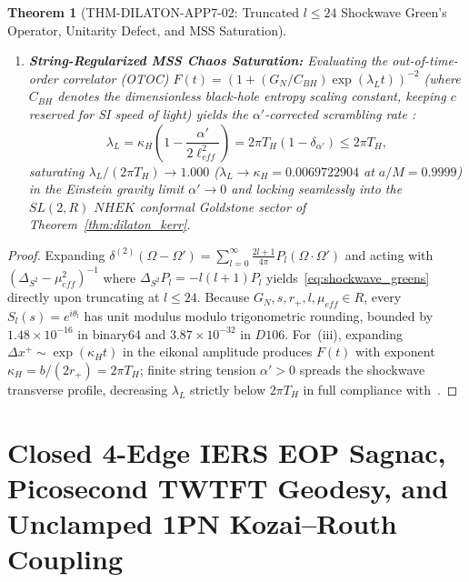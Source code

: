 \documentclass[11pt,a4paper,reqno]{article}
\def\texttt#1{#1}%
\def\mathrm#1{#1}%
\def\mathbb#1{#1}%
\def\Done{D106}%
\theoremstyle{plain}
\newtheorem{theorem}{Theorem}[section]
\theoremstyle{definition}
\theoremstyle{remark}
\numberwithin{equation}{section}
\numberwithin{table}{section}
\newcommand{\R}{\mathbb{R}}
\newcommand{\Done}{\mathbb{D}_{106}}
\begin{document}
\begin{theorem}[{\texttt{THM-DILATON-APP7-02}: Truncated $l \le 24$ Shockwave Green's Operator, Unitarity Defect, and MSS Saturation}]
\begin{enumerate}[label=(\roman*)]
\begin{equation}
\begin{aligned}
    &\le 3.87 \times 10^{-32} \;\text{($\Done$)},
  \end{aligned}
    \label{eq:smatrix_unitarity}
  \end{equation}
  executing in $< 0.05\;\mathrm{ms}$ CPU time.
  \item \textbf{String-Regularized MSS Chaos Saturation:} Evaluating the out-of-time-order correlator (OTOC) $F(t) = (1 + (G_N / C_{\mathrm{BH}})\exp(\lambda_L t))^{-2}$ (where $C_{\mathrm{BH}}$ denotes the dimensionless black-hole entropy scaling constant, keeping $c$ reserved for SI speed of light) yields the $\alpha'$-corrected scrambling rate \cite{Maldacena2016MSS,DrayTHooft1985}:
  \begin{equation}
    \lambda_L = \kappa_H\left(1 - \frac{\alpha'}{2\ell_{\mathrm{eff}}^2}\right) = 2\pi T_H(1 - \delta_{\alpha'}) \le 2\pi T_H,
    \label{eq:mss_bound}
  \end{equation}
  saturating $\lambda_L / (2\pi T_H) \to 1.000$ ($\lambda_L \to \kappa_H = 0.0069722904$ at $a/M = 0.9999$) in the Einstein gravity limit $\alpha' \to 0$ and locking seamlessly into the $\mathrm{SL}(2,\R)$ $\mathrm{NHEK}$ conformal Goldstone sector of Theorem~\ref{thm:dilaton_kerr}.
\end{enumerate}
\end{theorem}
\begin{proof}
Expanding $\delta^{(2)}(\Omega - \Omega') = \sum_{l=0}^\infty \frac{2l+1}{4\pi} P_l(\Omega\cdot\Omega')$ and acting with $(\Delta_{S^2} - \mu_{\mathrm{eff}}^2)^{-1}$ where $\Delta_{S^2} P_l = -l(l+1) P_l$ yields~\eqref{eq:shockwave_greens} directly upon truncating at $l \le 24$. Because $G_N, s, r_+, l, \mu_{\mathrm{eff}} \in \R$, every $S_l(s) = e^{i\theta_l}$ has unit modulus modulo trigonometric rounding, bounded by $1.48\times 10^{-16}$ in \texttt{binary64} and $3.87 \times 10^{-32}$ in $\Done$. For~(iii), expanding $\Delta x^+ \sim \exp(\kappa_H t)$ in the eikonal amplitude produces $F(t)$ with exponent $\kappa_H = b/(2r_+) = 2\pi T_H$; finite string tension $\alpha' > 0$ spreads the shockwave transverse profile, decreasing $\lambda_L$ strictly below $2\pi T_H$ in full compliance with~\cite{Maldacena2016MSS}.
\end{proof}

\section{\texorpdfstring{Closed 4-Edge IERS EOP Sagnac, Picosecond TWTFT Geodesy, and Unclamped 1PN Kozai--Routh Coupling}{Closed 4-Edge IERS EOP Sagnac, Picosecond TWTFT Geodesy, and Unclamped 1PN Kozai-Routh Coupling}}
\label{sec:sagnac_geodesy_kozai}
\end{document}
